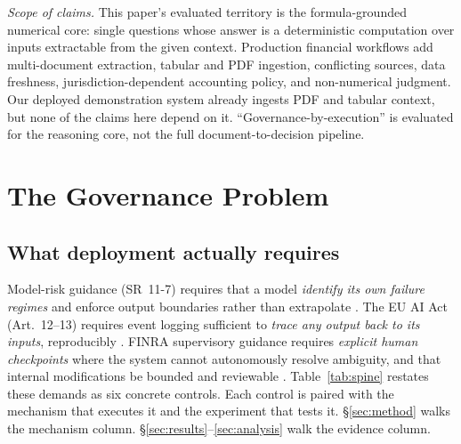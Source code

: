 \emph{Scope of claims.}
This paper's evaluated territory is the formula-grounded numerical core: single questions whose answer is a deterministic computation over inputs extractable from the given context.
Production financial workflows add multi-document extraction, tabular and PDF ingestion, conflicting sources, data freshness, jurisdiction-dependent accounting policy, and non-numerical judgment.
Our deployed demonstration system already ingests PDF and tabular context, but none of the claims here depend on it.
``Governance-by-execution'' is evaluated for the reasoning core, not the full document-to-decision pipeline.

\section{The Governance Problem}\label{sec:governance}

\subsection{What deployment actually requires}
Model-risk guidance (SR~11-7) requires that a model \emph{identify its own failure regimes} and enforce output boundaries rather than extrapolate \cite{fed2011sr117}.
The EU AI Act (Art.~12--13) requires event logging sufficient to \emph{trace any output back to its inputs}, reproducibly \cite{euaiact2024}.
FINRA supervisory guidance requires \emph{explicit human checkpoints} where the system cannot autonomously resolve ambiguity, and that internal modifications be bounded and reviewable \cite{finra2020ai}.
Table~\ref{tab:spine} restates these demands as six concrete controls.
Each control is paired with the mechanism that executes it and the experiment that tests it.
\S\ref{sec:method} walks the mechanism column.
\S\ref{sec:results}--\ref{sec:analysis} walk the evidence column.

